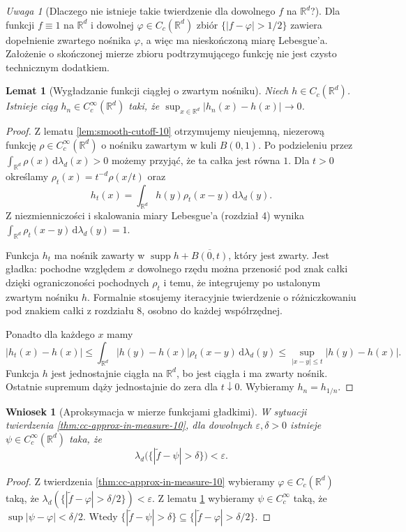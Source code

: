 \documentclass[11pt,a4paper,oneside]{book}
\numberwithin{equation}{chapter}
\theoremstyle{plain}
\newtheorem{lemat}[twierdzenie]{Lemat}
\newtheorem{wniosek}[twierdzenie]{Wniosek}
\theoremstyle{definition}
\theoremstyle{remark}
\newtheorem{uwaga}[twierdzenie]{Uwaga}
\begin{document}
\begin{uwaga}[Dlaczego nie istnieje takie twierdzenie dla dowolnego $f$ na $\mathbb R^d$?]
Dla funkcji $f\equiv1$ na $\mathbb R^d$ i dowolnej
$\varphi\in C_c(\mathbb R^d)$ zbiór
$\{|f-\varphi|>1/2\}$ zawiera dopełnienie
zwartego nośnika $\varphi$, a więc ma nieskończoną
miarę Lebesgue'a. Założenie o skończonej mierze
zbioru podtrzymującego funkcję nie jest czysto
technicznym dodatkiem.
\end{uwaga}

\begin{lemat}[Wygładzanie funkcji ciągłej o zwartym nośniku]
\label{lem:mollify-cc-10}
Niech $h\in C_c(\mathbb R^d)$. Istnieje ciąg
$h_n\in C_c^\infty(\mathbb R^d)$ taki, że
$\sup_{x\in\mathbb R^d}|h_n(x)-h(x)|\to0$.
\end{lemat}
\begin{proof}
Z lematu \ref{lem:smooth-cutoff-10} otrzymujemy
nieujemną, niezerową funkcję
$\rho\in C_c^\infty(\mathbb R^d)$ o nośniku
zawartym w kuli $B(0,1)$. Po podzieleniu przez
$\int_{\mathbb R^d}\rho(x)\,\mathrm d\lambda_d(x)>0$
możemy przyjąć, że ta całka jest równa $1$.
Dla $t>0$ określamy
$\rho_t(x)=t^{-d}\rho(x/t)$ oraz
\[
h_t(x)=\int_{\mathbb R^d}
 h(y)\rho_t(x-y)\,\mathrm d\lambda_d(y).
\]
Z niezmienniczości i skalowania miary Lebesgue'a
(rozdział 4) wynika
$\int_{\mathbb R^d}\rho_t(x-y)\,\mathrm d\lambda_d(y)=1$.

Funkcja $h_t$ ma nośnik zawarty w
$\operatorname{supp}h+\overline{B(0,t)}$,
który jest zwarty. Jest gładka: pochodne względem
$x$ dowolnego rzędu można przenosić pod znak
całki dzięki ograniczoności pochodnych $\rho_t$
i temu, że integrujemy po ustalonym zwartym
nośniku $h$. Formalnie stosujemy iteracyjnie
twierdzenie o różniczkowaniu pod znakiem całki
z rozdziału 8, osobno do każdej współrzędnej.

Ponadto dla każdego $x$ mamy
\[
|h_t(x)-h(x)|
\le\int_{\mathbb R^d}|h(y)-h(x)|\rho_t(x-y)
\,\mathrm d\lambda_d(y)
\le\sup_{|x-y|\le t}|h(y)-h(x)|.
\]
Funkcja $h$ jest jednostajnie ciągła na
$\mathbb R^d$, bo jest ciągła i ma zwarty nośnik.
Ostatnie supremum dąży jednostajnie do zera dla
$t\downarrow0$. Wybieramy $h_n=h_{1/n}$.
\end{proof}

\begin{wniosek}[Aproksymacja w mierze funkcjami gładkimi]
\label{cor:smooth-approx-in-measure-10}
W sytuacji twierdzenia
\ref{thm:cc-approx-in-measure-10}, dla dowolnych
$\varepsilon,\delta>0$ istnieje
$\psi\in C_c^\infty(\mathbb R^d)$ taka, że
\[
\lambda_d\bigl(\{|\widetilde f-\psi|>\delta\}\bigr)
<\varepsilon.
\]
\end{wniosek}
\begin{proof}
Z twierdzenia \ref{thm:cc-approx-in-measure-10}
wybieramy $\varphi\in C_c(\mathbb R^d)$ taką,
że $\lambda_d(\{|\widetilde f-\varphi|>
\delta/2\})<\varepsilon$.
Z lematu \ref{lem:mollify-cc-10} wybieramy
$\psi\in C_c^\infty$ taką, że
$\sup|\psi-\varphi|<\delta/2$.
Wtedy
$\{|\widetilde f-\psi|>\delta\}\subseteq
\{|\widetilde f-\varphi|>\delta/2\}$.
\end{proof}
\end{document}
